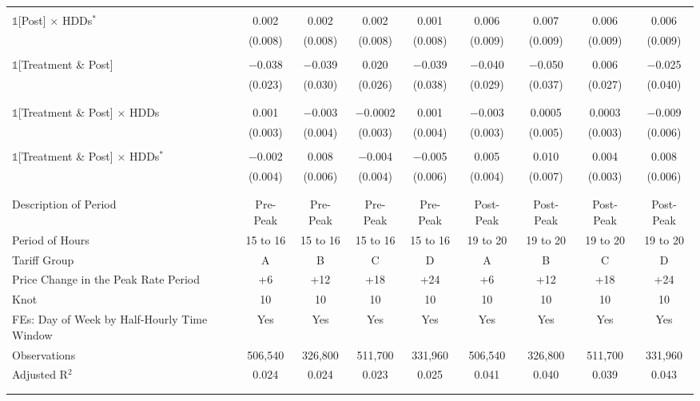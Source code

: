 \begin{table}[t!]
\begin{ThreePartTable}
\begin{landscape}
\begin{longtable}{@{\extracolsep{1.5pt}}lcccccccc}
                & & & & & & & & \\
                $\mathbb{1}$[Post] $\times$ HDDs$^{*}$ & 0.002 & 0.002 & 0.002 & 0.001 & 0.006 & 0.007 & 0.006 & 0.006 \\
                & (0.008) & (0.008) & (0.008) & (0.008) & (0.009) & (0.009) & (0.009) & (0.009) \\
                & & & & & & & & \\
                $\mathbb{1}$[Treatment \& Post] & $-$0.038 & $-$0.039 & 0.020 & $-$0.039 & $-$0.040 & $-$0.050 & 0.006 & $-$0.025 \\
                & (0.023) & (0.030) & (0.026) & (0.038) & (0.029) & (0.037) & (0.027) & (0.040) \\
                & & & & & & & & \\
                & & & & & & & & \\
                $\mathbb{1}$[Treatment \& Post] $\times$ HDDs & 0.001 & $-$0.003 & $-$0.0002 & 0.001 & $-$0.003 & 0.0005 & 0.0003 & $-$0.009 \\
                & (0.003) & (0.004) & (0.003) & (0.004) & (0.003) & (0.005) & (0.003) & (0.006) \\
                & & & & & & & & \\
                $\mathbb{1}$[Treatment \& Post] $\times$ HDDs$^{*}$ & $-$0.002 & 0.008 & $-$0.004 & $-$0.005 & 0.005 & 0.010 & 0.004 & 0.008 \\
                & (0.004) & (0.006) & (0.004) & (0.006) & (0.004) & (0.007) & (0.003) & (0.006) \\
                & & & \\
                \hline
                \\[-2.0ex]
                Description of Period & Pre-Peak & Pre-Peak & Pre-Peak & Pre-Peak & Post-Peak & Post-Peak & Post-Peak & Post-Peak \\
                Period of Hours & 15 to 16 & 15 to 16 & 15 to 16 & 15 to 16 & 19 to 20 & 19 to 20 & 19 to 20 & 19 to 20 \\
                Tariff Group & A & B & C & D & A & B & C & D \\
                Price Change in the Peak Rate Period & +6 & +12 & +18 & +24 & +6 & +12 & +18 & +24 \\
                Knot & 10 & 10 & 10 & 10 & 10 & 10 & 10 & 10 \\
                FEs: Day of Week by Half-Hourly Time Window & Yes & Yes & Yes & Yes & Yes & Yes & Yes & Yes \\
                Observations & 506,540 & 326,800 & 511,700 & 331,960 & 506,540 & 326,800 & 511,700 & 331,960 \\
                Adjusted R$^{2}$ & 0.024 & 0.024 & 0.023 & 0.025 & 0.041 & 0.040 & 0.039 & 0.043 \\
                \\[-2.0ex]
                \hline \hline
                \\[-4.5ex]


\end{longtable}
\end{landscape}
\end{ThreePartTable}
\end{table}
